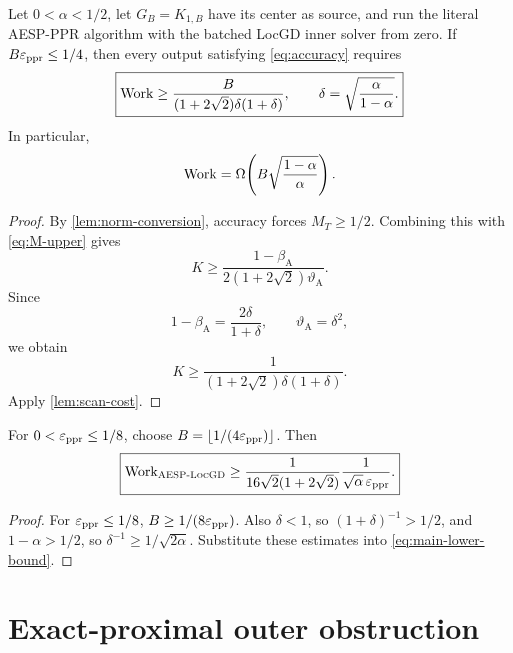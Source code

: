 \documentclass[11pt]{article}
\begin{document}
\begin{theorem}
\label{thm:star-lower-bound}
Let $0<\alpha<1/2$, let $G_B=K_{1,B}$ have its center as source, and run the
literal AESP-PPR algorithm with the batched LocGD inner solver from zero.  If
$B\varepsilon_{\mathrm{ppr}}\leq1/4$, then every output satisfying \cref{eq:accuracy} requires
\begin{equation}
  \boxed{
  \operatorname{Work}
  \geq
  \frac{B}
  {(1+2\sqrt2)\delta(1+\delta)},
  \qquad
  \delta=\sqrt{\frac{\alpha}{1-\alpha}}.}
  \label{eq:main-lower-bound}
\end{equation}
In particular,
\begin{equation}
  \operatorname{Work}=\Omega\!\left(B\sqrt{\frac{1-\alpha}{\alpha}}\right).
  \label{eq:B-alpha-asymptotic}
\end{equation}
\end{theorem}

\begin{proof}
By \cref{lem:norm-conversion}, accuracy forces $M_T\geq1/2$.  Combining this
with \cref{eq:M-upper} gives
\[
  K\geq\frac{1-\beta_{\mathrm A}}{2(1+2\sqrt2)\vartheta_{\mathrm A}}.
\]
Since
\[
  1-\beta_{\mathrm A}=\frac{2\delta}{1+\delta},
  \qquad \vartheta_{\mathrm A}=\delta^2,
\]
we obtain
\[
  K\geq\frac1{(1+2\sqrt2)\delta(1+\delta)}.
\]
Apply \cref{lem:scan-cost}.
\end{proof}

\begin{corollary}
\label{cor:epsilon-bound}
For $0<\varepsilon_{\mathrm{ppr}}\leq1/8$, choose
$B=\lfloor1/(4\varepsilon_{\mathrm{ppr}})\rfloor$.  Then
\begin{equation}
  \boxed{
  \operatorname{Work}_{\textsc{AESP}\text{-}\textsc{LocGD}}
  \geq
  \frac{1}{16\sqrt2(1+2\sqrt2)}
  \frac1{\sqrt\alpha\,\varepsilon_{\mathrm{ppr}}}.}
  \label{eq:epsilon-lower-bound}
\end{equation}
\end{corollary}

\begin{proof}
For $\varepsilon_{\mathrm{ppr}}\leq1/8$,
$B\geq1/(8\varepsilon_{\mathrm{ppr}})$.  Also $\delta<1$, so
$(1+\delta)^{-1}>1/2$, and $1-\alpha>1/2$, so
$\delta^{-1}\geq1/\sqrt{2\alpha}$.  Substitute these estimates into
\cref{eq:main-lower-bound}.
\end{proof}

\section{Exact-proximal outer obstruction}
\label{sec:exact-prox}
\end{document}
